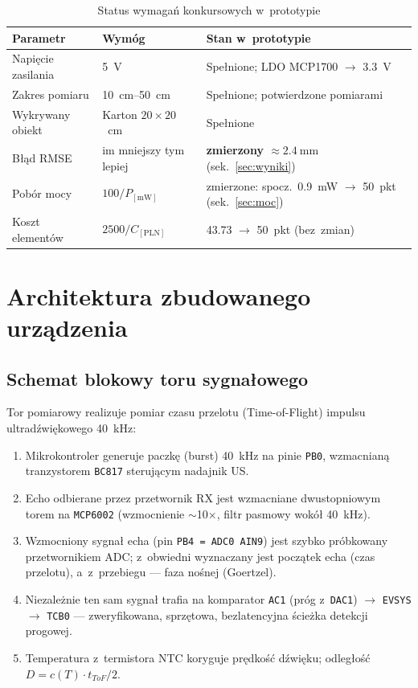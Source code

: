 \documentclass[a4paper,11pt]{article}
\begin{document}
\begin{table}[H]
	\centering
	\caption{Status wymagań konkursowych w~prototypie}
	\label{tab:wymagania}
	\begin{tabularx}{\textwidth}{llX}
		\toprule
		\textbf{Parametr} & \textbf{Wymóg} & \textbf{Stan w~prototypie} \\
		\midrule
		Napięcie zasilania & \SI{5}{\volt} & Spełnione; LDO MCP1700 $\to$ \SI{3,3}{\volt} \\
		Zakres pomiaru & \SIrange{10}{50}{\centi\metre} & Spełnione; potwierdzone pomiarami \\
		Wykrywany obiekt & Karton $20\times20$~\si{\centi\metre} & Spełnione \\
		Błąd RMSE & im mniejszy tym lepiej & \textbf{zmierzony $\approx\SI{2,4}{\milli\metre}$} (sek.~\ref{sec:wyniki}) \\
		Pobór mocy & $100/P_{[\si{\milli\watt}]}$ & zmierzone: spocz.\ \SI{0,9}{\milli\watt} $\to$ 50~pkt (sek.~\ref{sec:moc}) \\
		Koszt elementów & $2500/C_{[\text{PLN}]}$ & \SI{43,73}{\PLN} $\to$ 50~pkt (bez~zmian) \\
		\bottomrule
	\end{tabularx}
\end{table}

\section{Architektura zbudowanego urządzenia}
\label{sec:arch}

\subsection{Schemat blokowy toru sygnałowego}

Tor pomiarowy realizuje pomiar czasu przelotu (Time-of-Flight) impulsu
ultradźwiękowego \SI{40}{\kilo\hertz}:

\begin{enumerate}[nosep]
	\item Mikrokontroler generuje paczkę (burst) \SI{40}{\kilo\hertz} na pinie
	\texttt{PB0}, wzmacnianą tranzystorem \texttt{BC817} sterującym nadajnik US.
	\item Echo odbierane przez przetwornik RX jest wzmacniane dwustopniowym
	torem na \texttt{MCP6002} (wzmocnienie $\sim$10$\times$, filtr pasmowy wokół
	\SI{40}{\kilo\hertz}).
	\item Wzmocniony sygnał echa (pin \texttt{PB4 = ADC0 AIN9}) jest szybko
	próbkowany przetwornikiem ADC; z~obwiedni wyznaczany jest początek echa
	(czas przelotu), a~z~przebiegu --- faza nośnej (Goertzel).
	\item Niezależnie ten sam sygnał trafia na komparator \texttt{AC1}
	(próg z~\texttt{DAC1}) $\to$ \texttt{EVSYS} $\to$ \texttt{TCB0} ---
	zweryfikowana, sprzętowa, bezlatencyjna ścieżka detekcji progowej.
	\item Temperatura z~termistora NTC koryguje prędkość dźwięku;
	odległość $D = c(T)\cdot t_{ToF}/2$.
\end{enumerate}
\end{document}
